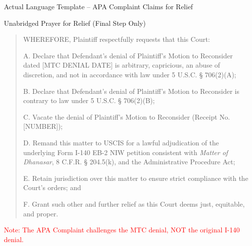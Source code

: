 \documentclass[11pt]{beamer}
\begin{document}
	\begin{frame}[allowframebreaks]{Actual Language Template -- APA Complaint Claims for Relief}
		\scriptsize
		\begin{block}{Unabridged Prayer for Relief (Final Step Only)}
			\begin{quote}
				WHEREFORE, Plaintiff respectfully requests that this Court:
				
				A. Declare that Defendant's denial of Plaintiff's Motion to Reconsider dated [MTC DENIAL DATE] is arbitrary, capricious, an abuse of discretion, and not in accordance with law under 5 U.S.C. § 706(2)(A);
				
				B. Declare that Defendant's denial of Plaintiff's Motion to Reconsider is contrary to law under 5 U.S.C. § 706(2)(B);
				
				C. Vacate the denial of Plaintiff's Motion to Reconsider (Receipt No. [NUMBER]);
				
				D. Remand this matter to USCIS for a lawful adjudication of the underlying Form I-140 EB-2 NIW petition consistent with \textit{Matter of Dhanasar}, 8 C.F.R. § 204.5(k), and the Administrative Procedure Act;
				
				E. Retain jurisdiction over this matter to ensure strict compliance with the Court's orders; and
				
				F. Grant such other and further relief as this Court deems just, equitable, and proper.
			\end{quote}
			\textcolor{red}{Note: The APA Complaint challenges the MTC denial, NOT the original I-140 denial.}
		\end{block}
	\end{frame}
	
	
\end{document}

